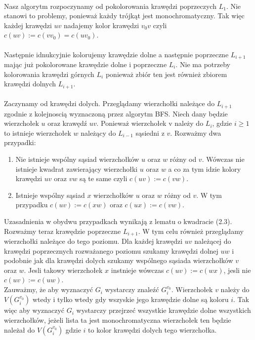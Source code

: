 \documentclass[12pt,a4paper,titlepage]{article}
\begin{document}
\\
Nasz algorytm rozpoczynamy od pokolorowania krawędzi poprzeczych $L_1$. Nie stanowi to problemy, ponieważ każdy trójkąt jest monochromatyczny. Tak więc każdej krawędzi $uv$ nadajemy kolor krawędzi $v_0 v$ czyli $c(uv):=c(v v_0 )=c(u v_0 )$.\\
\\
Następnie idnukcyjnie kolorujemy krawędzie dolne a następnie poprzeczne $L_{i+1}$ mając już pokolorowane krawędzie dolne i poprzeczne $L_i$. Nie ma potrzeby kolorowania krawędzi górnych $L_i$ ponieważ zbiór ten jest również zbiorem krawędzi dolnych $L_{i+1}$.\\
\\
Zaczynamy od krawędzi dolych. Przeglądamy wierzchołki należące do $L_{i+1}$ zgodnie z kolejnoscią wyznaczoną przez algorytm BFS. Niech dany będzie wierzchołek $u$ oraz krawędź $uv$. Ponieważ wierzchołek v należy do $L_i$, gdzie $i\geqslant 1$ to istnieje wierzchołek $w$ należący do $L_{i-1}$ sąsiedni z $v$. Rozważmy dwa przypadki:
\begin{enumerate}
\item Nie istnieje wspólny sąsiad wierzchołków $u$ oraz $w$ różny od $v$. Wówczas nie istnieje kwadrat zawierający wierzchołki $u$ oraz $w$ a co za tym idzie kolory krawędzi $uv$ oraz $vw$ są te same czyli $c(uv):=c(vw)$.
\item Istnieje wspólny sąsiad $x$ wierzchołków $u$ oraz $w$ różny od $v$. W tym przypadku $c(uv):=c(xw)$ oraz $c(ux):=c(vw)$. 
\end{enumerate}
Uzasadnienia w obydwu przypadkach wynikają z lematu o kwadracie (2.3).\\
Rozważmy teraz krawędzie poprzeczne $L_{i+1}$. W tym celu również przeglądamy wierzchołki należące do tego poziomu. Dla każdej krawędzi $uv$ należącej do krawędzi poprzecznych rozważanego poziomu szukamy krawędzi dolnej $uw$ i podobnie jak dla krawędzi dolych szukamy wspólnego sąsiada wierzchołków $v$ oraz $w$. Jesli takowy wierzchołek $x$ instnieje wówczas $c(uv):=c(wx)$, jesli nie $c(uv):=c(uw)$.\\
Zauważmy, że aby wyznaczyć $G_i$ wystarczy znaleźć $G_i ^{v_0}$. Wierzchołek $v$ należy do $V(G_i ^{v_0})$ wtedy i tylko wtedy gdy wszyskie jego krawędzie dolne są koloru $i$. Tak więc aby wyznaczyć $G_i$ wystarczy przejrzeć wszystkie krawędzie dolne wszystkich wierzchołków, jeżeli lista ta jest monochromatyczna wierzchołek ten będzie należał do $V(G_i ^{v_0})$ gdzie $i$ to kolor krawędzi dolych tego wierzchołka.\\
\end{document}
